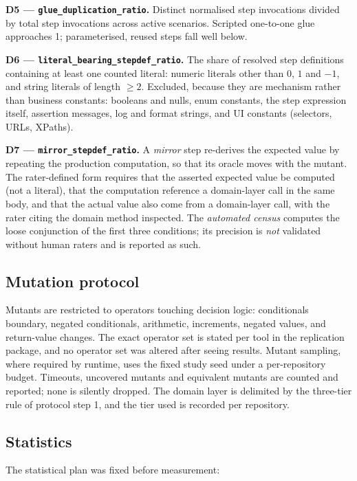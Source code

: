 \textbf{D5 --- \texttt{glue\_duplication\_ratio}.} Distinct normalised step invocations divided by
total step invocations across active scenarios. Scripted one-to-one glue approaches 1; parameterised,
reused steps fall well below.

\textbf{D6 --- \texttt{literal\_bearing\_stepdef\_ratio}.} The share of resolved step definitions
containing at least one counted literal: numeric literals other than $0$, $1$ and $-1$, and string
literals of length $\ge 2$. Excluded, because they are mechanism rather than business constants:
booleans and nulls, enum constants, the step expression itself, assertion messages, log and format
strings, and UI constants (selectors, URLs, XPaths).

\textbf{D7 --- \texttt{mirror\_stepdef\_ratio}.} A \emph{mirror} step re-derives the expected value by
repeating the production computation, so that its oracle moves with the mutant. The rater-defined
form requires that the asserted expected value be computed (not a literal), that the computation
reference a domain-layer call in the same body, and that the actual value also come from a
domain-layer call, with the rater citing the domain method inspected. The \emph{automated census}
computes the loose conjunction of the first three conditions; its precision is \emph{not} validated
without human raters and is reported as such.

\subsection{Mutation protocol}

Mutants are restricted to operators touching decision logic: conditionals boundary, negated
conditionals, arithmetic, increments, negated values, and return-value changes. The exact operator set
is stated per tool in the replication package, and no operator set was altered after seeing results.
Mutant sampling, where required by runtime, uses the fixed study seed under a per-repository budget.
Timeouts, uncovered mutants and equivalent mutants are counted and reported; none is silently dropped.
The domain layer is delimited by the three-tier rule of protocol step 1, and the tier used is recorded
per repository.

\subsection{Statistics}

The statistical plan was fixed before measurement:

